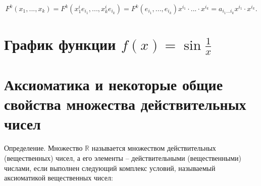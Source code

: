 \documentclass[a4paper, 12pt]{article} %
\begin{document}
\begin{equation}
    F^k(x_1,...,x_k) = F^k(x^i_1 e_{i_1}, ..., x^i_k e_{i_k}) = F^k(e_{i_1}, ..., e_{i_k}) x^{i_1} \cdot  ... \cdot x^{i_k} = a_{i_1 ... i_k} x^{i_1} \cdot x^{i_k}.
\end{equation}

\clearpage
\section*{График функции $f(x) = \sin \frac{1}{x} $}
\begin{center}
\end{center}

\clearpage
\section*{Аксиоматика и некоторые общие свойства множества действительных чисел}

Определение. Множество $\mathbb{R}$ называется множеством действительных (вещественных) чисел, а его элементы -- действительными (вещественными) числами, если выполнен следующий комплекс условий, называемый аксиоматикой вещественных чисел:
\end{document}
